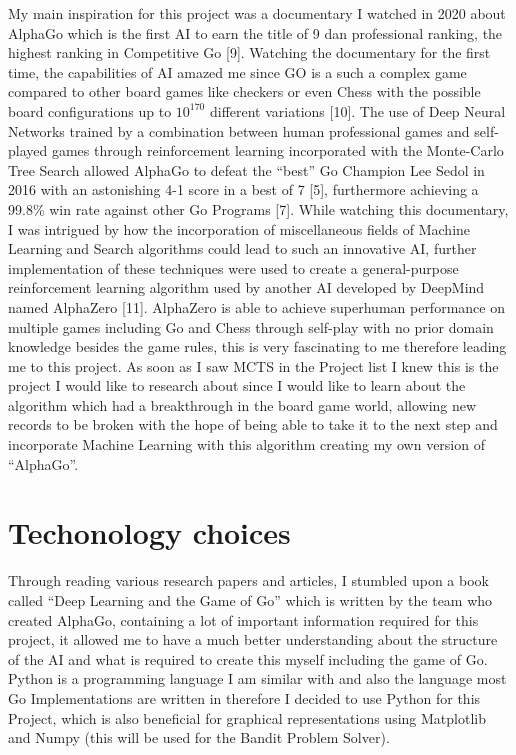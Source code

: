\documentclass[]{final_report}
\begin{document}
My main inspiration for this project was a documentary I watched in 2020 about AlphaGo which is the first AI to earn the title of 9 dan professional ranking, the highest ranking in Competitive Go [9].  Watching the documentary for the first time, the capabilities of AI amazed me since GO is a such a complex game compared to other board games like checkers or even Chess with the possible board configurations up to $10^{170}$ different variations [10]. The use of Deep Neural Networks trained by a combination between human professional games and self-played games through reinforcement learning incorporated with the Monte-Carlo Tree Search allowed AlphaGo to defeat the “best” Go Champion Lee Sedol in 2016 with an astonishing 4-1 score in a best of 7 [5], furthermore achieving a 99.8\% win rate against other Go Programs [7]. While watching this documentary, I was intrigued by how the incorporation of miscellaneous fields of Machine Learning and Search algorithms could lead to such an innovative AI, further implementation of these techniques were used to create a general-purpose reinforcement learning algorithm used by another AI developed by DeepMind named AlphaZero [11]. AlphaZero is able to achieve superhuman performance on multiple games including Go and Chess through self-play with no prior domain knowledge besides the game rules, this is very fascinating to me therefore leading me to this project. As soon as I saw MCTS in the Project list I knew this is the project I would like to research about since I would like to learn about the algorithm which had a breakthrough in the board game world, allowing new records to be broken with the hope of being able to take it to the next step and incorporate Machine Learning with this algorithm creating my own version of “AlphaGo”. 
\newpage
\section{Techonology choices}

Through reading various research papers and articles, I stumbled upon a book called “Deep Learning and the Game of Go” which is written by the team who created AlphaGo, containing a lot of important information required for this project, it allowed me to have a much better understanding about the structure of the AI and what is required to create this myself including the game of Go. Python is a programming language I am similar with and also the language most Go Implementations are written in therefore I decided to use Python for this Project, which is also beneficial for graphical representations using Matplotlib and Numpy (this will be used for the Bandit Problem Solver). 
\end{document}
